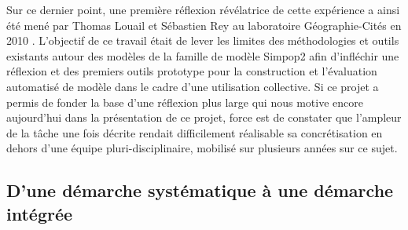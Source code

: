 
Sur ce dernier point, une première réflexion révélatrice de cette expérience a ainsi été mené par Thomas Louail et Sébastien Rey au laboratoire Géographie-Cités en 2010 \autocite{Louail2010}. L'objectif de ce travail était de lever les limites des méthodologies et outils existants autour des modèles de la famille de modèle Simpop2 afin d'infléchir une réflexion et des premiers outils prototype pour la construction et l'évaluation automatisé de modèle dans le cadre d'une utilisation collective. Si ce projet a permis de fonder la base d'une réflexion plus large qui nous motive encore aujourd'hui dans la présentation de ce projet, force est de constater que l'ampleur de la tâche une fois décrite rendait difficilement réalisable sa concrétisation en dehors d'une équipe pluri-disciplinaire, mobilisé sur plusieurs années sur ce sujet.


\subsection{D'une démarche systématique à une démarche intégrée}


